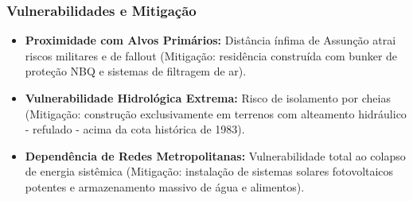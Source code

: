 \subsubsection{Vulnerabilidades e
Mitigação}

\begin{itemize}
\tightlist
\item
  \textbf{Proximidade com Alvos Primários:} Distância ínfima de Assunção
  atrai riscos militares e de fallout (Mitigação: residência construída
  com bunker de proteção NBQ e sistemas de filtragem de ar).
\item
  \textbf{Vulnerabilidade Hidrológica Extrema:} Risco de isolamento por
  cheias (Mitigação: construção exclusivamente em terrenos com
  alteamento hidráulico - refulado - acima da cota histórica de 1983).
\item
  \textbf{Dependência de Redes Metropolitanas:} Vulnerabilidade total ao
  colapso de energia sistêmica (Mitigação: instalação de sistemas
  solares fotovoltaicos potentes e armazenamento massivo de água e
  alimentos).
\end{itemize}

